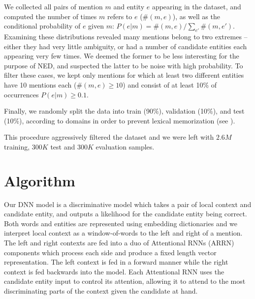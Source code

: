\documentclass[11pt]{article}
\begin{document}
We collected all pairs of mention $m$ and entity $e$ appearing in the dataset, and computed the number of times $m$ refers to $e$ ($\#(m,e)$), as well as the conditional probability of $e$ given $m$: $P(e|m)=\#(m,e)/\sum_{e'}\#(m,e')$. Examining these distributions revealed many mentions belong to two extremes -- either they had very little ambiguity, or had a number of candidate entities each appearing very few times. We deemed the former to be less interesting for the purpose of NED, and suspected the latter to be noise with high probability. To filter these cases, we kept only mentions for which at least two different entities have 10 mentions each ($\#(m,e) \ge 10$) and consist of at least 10\% of occurrences $P(e|m) \ge 0.1$.

Finally, we randomly split the data into train (90\%), validation (10\%), and test (10\%), according to domains in order to prevent lexical memorization (see \cite{levy2015supervised}).

This procedure aggressively filtered the dataset and we were left with $2.6M$ training, $300K$ test and $300K$ evaluation samples. %



\section{Algorithm}

Our DNN model is a discriminative model which takes a pair of local context and candidate entity, and outputs a likelihood for the candidate entity being correct. Both words and entities are represented using embedding dictionaries and we interpret local context as a window-of-words to the left and right of a mention. The left and right contexts are fed into a duo of Attentional RNNs (ARRN) components which process each side and produce a fixed length vector representation. The left context is fed in a forward manner while the right context is fed backwards into the model. Each Attentional RNN uses the candidate entity input to control its attention, allowing it to attend to the most discriminating parts of the context given the candidate at hand. 
\end{document}
